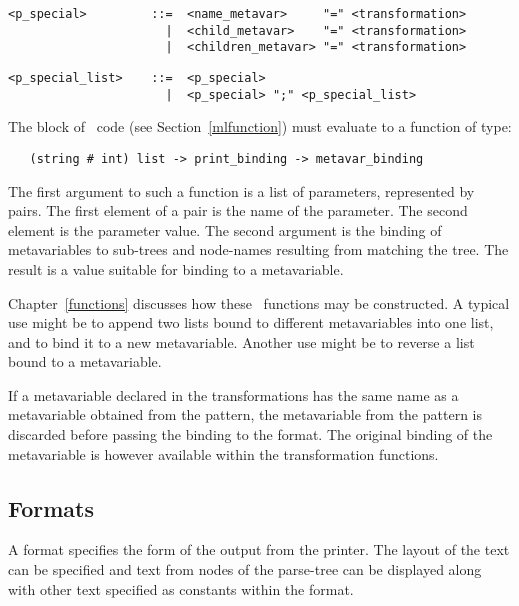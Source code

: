 \begin{small}\begin{verbatim}
<p_special>         ::=  <name_metavar>     "=" <transformation>
                      |  <child_metavar>    "=" <transformation>
                      |  <children_metavar> "=" <transformation>
\end{verbatim}\end{small}

\begin{small}\begin{verbatim}
<p_special_list>    ::=  <p_special>
                      |  <p_special> ";" <p_special_list>
\end{verbatim}\end{small}

\noindent
The block of \ML\ code (see Section~\ref{mlfunction}) must evaluate to a
function of type:

\begin{small}\begin{verbatim}
   (string # int) list -> print_binding -> metavar_binding
\end{verbatim}\end{small}

\noindent
The first argument to such a function is a list of parameters, represented by
pairs. The first element of a pair is the name of the parameter. The second
element is the parameter value. The second argument is the binding of
metavariables to sub-trees and node-names resulting from matching the tree.
The result is a value suitable for binding to a metavariable.

Chapter~\ref{functions} discusses how these \ML\ functions may be constructed.
A typical use might be to append two lists bound to different metavariables
into one list, and to bind it to a new metavariable. Another use might be to
reverse a list bound to a metavariable.

If a metavariable declared in the transformations has the same name as a
metavariable obtained from the pattern, the metavariable from the pattern is
discarded before passing the binding to the format. The original binding of
the metavariable is however available within the transformation functions.


\subsection{Formats\label{formats}}

A format specifies the form of the output from the printer. The layout of the
text can be specified and text from nodes of the parse-tree can be displayed
along with other text specified as constants within the format.

